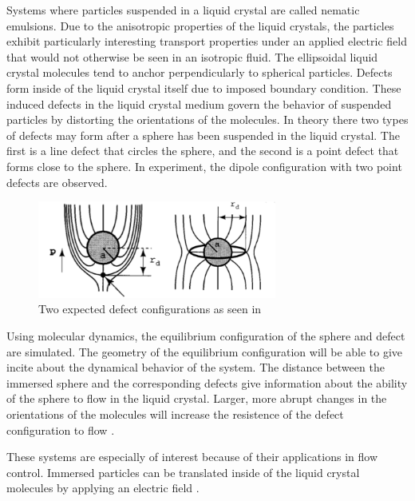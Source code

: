 \documentclass[preprint, aps]{revtex4-1}
\begin{document}
Systems where particles suspended in a liquid crystal are called nematic 
emulsions. Due to the anisotropic properties of the liquid crystals, the 
particles exhibit particularly interesting transport properties under an applied 
electric field that would not otherwise be seen in an isotropic fluid. The
ellipsoidal liquid crystal molecules tend to anchor perpendicularly to spherical
particles. Defects form inside of the liquid crystal itself due to imposed
boundary condition. These induced defects in the liquid crystal medium govern the
behavior of suspended particles by distorting the orientations of the molecules.
In theory there two types of defects may form after a sphere has been suspended
in the liquid crystal. The first is a line defect that circles the sphere, and
the second is a point defect that forms close to the sphere. In experiment, the
dipole configuration with two point defects are observed.
	\begin{figure}[!htbp] 
		\includegraphics[width=0.7\textwidth]{defect-config.png}
		\caption{Two expected defect configurations as seen in 
		\cite{lubensky98}}
		\label{fig:defect-config}
	\end{figure}

Using molecular dynamics, the equilibrium configuration of the sphere and defect
 are simulated. The geometry of the equilibrium configuration will be able to 
 give incite about the dynamical behavior of the system. The distance between the
immersed sphere and the corresponding defects give information about the ability
of the sphere to flow in the liquid crystal. Larger, more abrupt changes in the 
orientations of the molecules will increase the resistence of the defect 
configuration to flow \cite{billeter00}.

These systems are especially of interest because of their applications in flow 
control. Immersed particles can be translated inside of the liquid crystal
molecules by applying an electric field \cite{conklin17}. 
\end{document}

